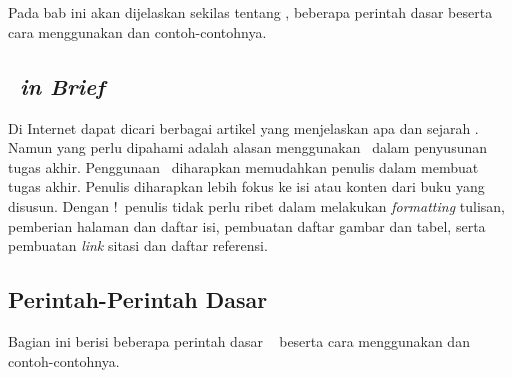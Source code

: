 \chapter{\babTiga}
Pada bab ini akan dijelaskan sekilas tentang \latex, beberapa perintah dasar \latex beserta cara menggunakan dan contoh-contohnya.

\section{\latex~\textit{in Brief}}

Di Internet dapat dicari berbagai artikel yang menjelaskan apa dan sejarah \latex. Namun yang perlu dipahami adalah alasan menggunakan \latex~dalam penyusunan tugas akhir. Penggunaan \latex~diharapkan memudahkan penulis dalam membuat tugas akhir. Penulis diharapkan lebih fokus ke isi atau konten dari buku yang disusun. Dengan \latex!~penulis tidak perlu ribet dalam melakukan \textit{formatting} tulisan, pemberian halaman dan daftar isi, pembuatan daftar gambar dan tabel, serta pembuatan \textit{link} sitasi dan daftar referensi.

\section{Perintah-Perintah Dasar \latex}
Bagian ini berisi beberapa perintah dasar \latex~ beserta cara menggunakan dan contoh-contohnya.

